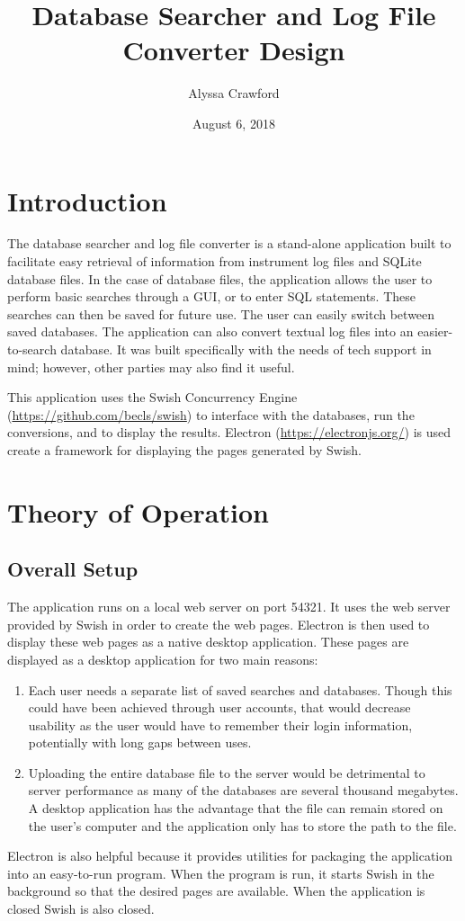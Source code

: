 \documentclass[letterpaper,11pt,twoside,final]{article}
\begin{document}
\title{Database Searcher and Log File Converter Design}
\author{Alyssa Crawford}
\date{August 6, 2018}
\coverpage

\section*{Introduction}
The database searcher and log file converter is a stand-alone
application built to facilitate easy retrieval of information from
instrument log files and SQLite database files.
In the case of
database files, the application allows the user to perform basic
searches through a GUI, or to enter SQL statements. These searches can
then be saved for future use. The user can easily switch between saved
databases. The application can
also convert textual log files into an easier-to-search database.
It was built specifically with the
needs of tech support in mind; however, other parties may also find it
useful.

This application uses the Swish Concurrency Engine (\url{https://github.com/becls/swish}) to interface with
the databases, run the conversions, and to display the
results. Electron (\url{https://electronjs.org/}) is used create a framework for displaying the pages generated by Swish.  

\section*{Theory of Operation}
\subsection*{Overall Setup}
The application runs on a local web server on port 54321.
It uses the web server provided by Swish in order to
create the web pages. Electron is then used to display these web pages as a native
desktop application. These pages are displayed as a desktop
application for two main reasons:
\begin{enumerate}
  \item Each user needs a separate list of saved searches and
    databases. Though this could have been achieved through user
    accounts, that would decrease usability as the user would have to
    remember their login information, potentially with long gaps between
    uses.
  \item Uploading the entire database file to the server would be detrimental to server performance as many of the databases
    are several thousand megabytes. A desktop application has the
    advantage that the file can remain stored on the user's computer and
    the application only has to store the path to the file.
\end{enumerate}
Electron is also helpful because it provides utilities for packaging
the application into an easy-to-run program. When the program is run, it starts Swish in the
background so that the desired pages are available. When the
application is closed Swish is also closed.
\end{document}
